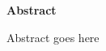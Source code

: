 \thispagestyle{empty}
\vspace{8cm}
\noindent
{\centerline {\bf \large Abstract}}
\vspace{1cm}
\noindent

Abstract goes here
